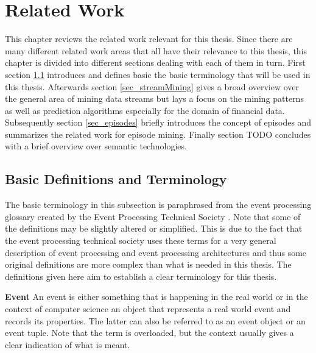 
\chapter{Related Work}
\label{chapter_related}

\ifpdf
    \graphicspath{{Chapter2/Figs/Raster/}{Chapter2/Figs/PDF/}{Chapter2/Figs/}}
\else
    \graphicspath{{Chapter2/Figs/Vector/}{Chapter2/Figs/}}
\fi

This chapter reviews the related work relevant for this thesis. Since there are many different related work areas that all have their relevance to this thesis, this chapter is divided into different sections dealing with each of them in turn. First section \ref{sec_basicDefinitions} introduces and defines basic the basic terminology that will be used in this thesis. Afterwards section \ref{sec_streamMining} gives a broad overview over the general area of mining data streams but lays a focus on the mining patterns as well as prediction algorithms especially for the domain of financial data. Subsequently section \ref{sec_episodes} briefly introduces the concept of episodes and summarizes the related work for episode mining. Finally section TODO concludes with a brief overview over semantic technologies.


\section{Basic Definitions and Terminology}
\label{sec_basicDefinitions}
The basic terminology in this subsection is paraphrased from the event processing glossary created by the Event Processing Technical Society \cite{luckham2011epts}. Note that some of the definitions may be slightly altered or simplified. This is due to the fact that the event processing technical society uses these terms for a very general description of event processing and event processing architectures and thus some original definitions are more complex than what is needed in this thesis. The definitions given here aim to establish a clear terminology for this thesis.

\begin{mydef}
\textbf{Event} An event is either something that is happening in the real world or in the context of computer science an object that represents a real world event and records its properties. The latter can also be referred to as an event object or an event tuple. Note that the term is overloaded, but the context usually gives a clear indication of what is meant.
\end{mydef}

